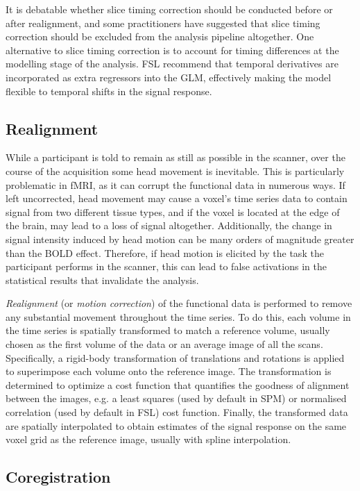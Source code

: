 It is debatable whether slice timing correction should be conducted before or after realignment, and some practitioners have suggested that slice timing correction should be excluded from the analysis pipeline altogether. One alternative to slice timing correction is to account for timing differences at the modelling stage of the analysis. FSL recommend that temporal derivatives are incorporated as extra regressors into the GLM, effectively making the model flexible to temporal shifts in the signal response. 

\subsection{Realignment}

While a participant is told to remain as still as possible in the scanner, over the course of the acquisition some head movement is inevitable. This is particularly problematic in fMRI, as it can corrupt the functional data in numerous ways. If left uncorrected, head movement may cause a voxel's time series data to contain signal from two different tissue types, and if the voxel is located at the edge of the brain, may lead to a loss of signal altogether. Additionally, the change in signal intensity induced by head motion can be many orders of magnitude greater than the BOLD effect. Therefore, if head motion is elicited by the task the participant performs in the scanner, this can lead to false activations in the statistical results that invalidate the analysis. 

\textit{Realignment} (or \textit{motion correction}) of the functional data is performed to remove any substantial movement throughout the time series. To do this, each volume in the time series is spatially transformed to match a reference volume, usually chosen as the first volume of the data or an average image of all the scans. Specifically, a rigid-body transformation of translations and rotations is applied to superimpose each volume onto the reference image. The transformation is determined to optimize a cost function that quantifies the goodness of alignment between the images, e.g. a least squares (used by default in SPM) or normalised correlation (used by default in FSL) cost function. Finally, the transformed data are spatially interpolated to obtain estimates of the signal response on the same voxel grid as the reference image, usually with spline interpolation.

\subsection{Coregistration}

